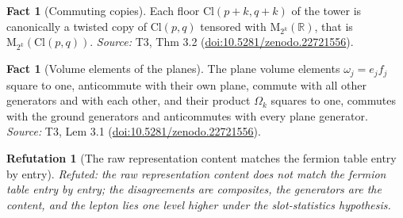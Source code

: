 \documentclass[11pt]{article}
\newtheorem{refutation}[theorem]{Refutation}
\theoremstyle{definition}
\newtheorem{fact}[theorem]{Fact}
\theoremstyle{plain}
\providecommand{\Cl}{}\renewcommand{\Cl}{\mathrm{Cl}}
\providecommand{\Mat}{}\renewcommand{\Mat}{\mathrm{M}}
\providecommand{\R}{}\renewcommand{\R}{\mathbb{R}}
\begin{document}
\begin{fact}[Commuting copies]\label{c:tower.commuting-copies}
Each floor $\Cl(p{+}k, q{+}k)$ of the tower is canonically a twisted copy of $\Cl(p,q)$ tensored with $\Mat_{2^k}(\R)$, that is $\Mat_{2^k}(\Cl(p,q))$.
\emph{Source:} T3, Thm 3.2 (\href{https://doi.org/10.5281/zenodo.22721556}{doi:10.5281/zenodo.22721556}).
\end{fact}

\begin{fact}[Volume elements of the planes]\label{c:tower.volume-elements-planes}
The plane volume elements $\omega_j = e_j f_j$ square to one, anticommute with their own plane, commute with all other generators and with each other, and their product $\Omega_k$ squares to one, commutes with the ground generators and anticommutes with every plane generator.
\emph{Source:} T3, Lem 3.1 (\href{https://doi.org/10.5281/zenodo.22721556}{doi:10.5281/zenodo.22721556}).
\end{fact}

\begin{refutation}[The raw representation content matches the fermion table entry by entry]\label{c:refuted.the-raw-representation-content-matches-the-fermi}
Refuted: the raw representation content does not match the fermion table entry by entry; the disagreements are composites, the generators are the content, and the lepton lies one level higher under the slot-statistics hypothesis.
\end{refutation}
\end{document}
